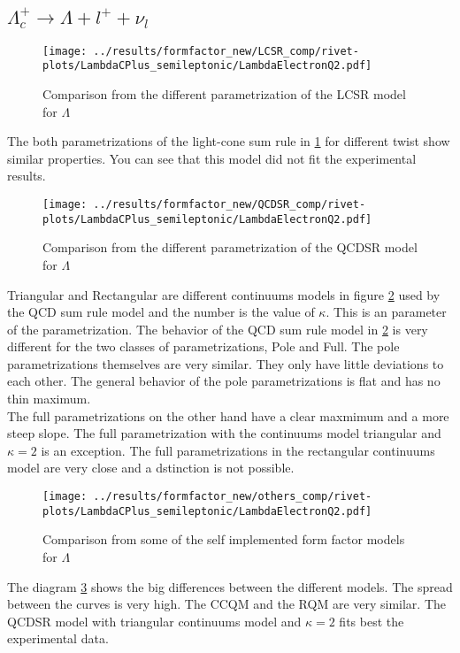 \clearpage
\subsection{\(\Lambda_c^+ \rightarrow \Lambda + l^+ + \nu_l\)}
\begin{figure}[h]
  \centering
  \texttt{[image: ../results/formfactor\_new/LCSR\_comp/rivet-plots/LambdaCPlus\_semileptonic/LambdaElectronQ2.pdf]}
  \caption{Comparison from the different parametrization of the LCSR model for \(\Lambda\)} \label{gr:lcsr}
\end{figure}
The both parametrizations of the light-cone sum rule in {\ref{gr:lcsr}} for 
different twist show similar properties. You can see that this model did not 
fit the experimental results.\\


\begin{figure}[h]
  \centering
  \texttt{[image: ../results/formfactor\_new/QCDSR\_comp/rivet-plots/LambdaCPlus\_semileptonic/LambdaElectronQ2.pdf]}
  \caption{Comparison from the different parametrization of the QCDSR model for \(\Lambda\)} \label{gr:qcdsr}
\end{figure}
Triangular and Rectangular are different continuums models in figure 
{\ref{gr:qcdsr}} used by the QCD sum rule  model and the number is the value 
of \(\kappa\). This is an parameter of the parametrization.
The behavior of the QCD sum rule model  in {\ref{gr:qcdsr}} is very different 
for the two classes of parametrizations, Pole and Full. The pole 
parametrizations themselves are very similar. They only have little deviations 
to each other. The general behavior of the pole parametrizations is flat and 
has no thin maximum.\\ 
The full parametrizations on the other hand have a clear maxmimum and a more steep 
slope. The full parametrization with the continuums model triangular and \(\kappa = 2\) is an 
exception. The full parametrizations in the rectangular continuums model 
are very close and a dstinction is not possible.\\

\begin{figure}[h]
  \centering
  \texttt{[image: ../results/formfactor\_new/others\_comp/rivet-plots/LambdaCPlus\_semileptonic/LambdaElectronQ2.pdf]}
  \caption{Comparison from some of the self implemented form factor models for \(\Lambda\)} \label{gr:others_comp}
\end{figure}
The diagram {\ref{gr:others_comp}} shows the big differences between the 
different models. The spread between the curves is very high. The CCQM and 
the RQM are very similar. The QCDSR model with triangular continuums model 
and \(\kappa = 2\) fits best the experimental data.\\

